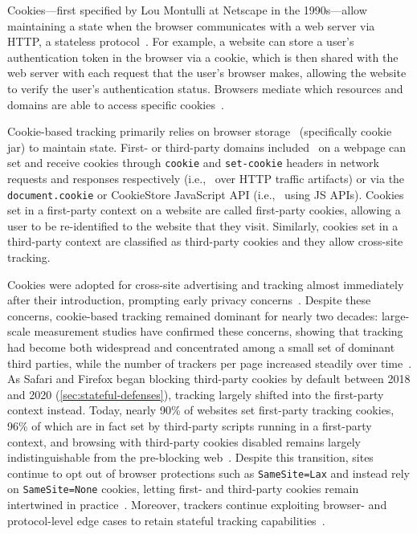 Cookies---first specified by Lou Montulli at Netscape in the 1990s---allow maintaining a state when the browser communicates with a web server via HTTP, a stateless protocol~\cite{kristolHTTPCookiesStandards2001}.
%
For example, a website can store a user's authentication token in the browser via a cookie, which is then shared with the web server with each request that the user's browser makes, allowing the website to verify the user's authentication status.
%
Browsers mediate which resources and domains are able to access specific cookies~\cite{beugin2024WebAlmanac2024,singhIncoherenciesWebBrowser2010,mdnSameoriginPolicySecurity2024}.


Cookie-based tracking primarily relies on browser storage \symStorage\ (specifically cookie jar) to maintain state. 
%
First- or third-party domains included \symInclusion\ on a webpage can set and receive cookies through \texttt{cookie} and \texttt{set-cookie} headers in network requests and responses respectively (i.e., \symSharing\ over HTTP traffic artifacts) or via the \texttt{document.cookie} or CookieStore JavaScript API (i.e., \symExecution\ using JS APIs).
%
Cookies set in a first-party context on a website are called first-party cookies, allowing a user to be re-identified to the website that they visit.
%
Similarly, cookies set in a third-party context are classified as third-party cookies and they allow cross-site tracking.


Cookies were adopted for cross-site advertising and tracking almost immediately after their introduction, prompting early privacy concerns~\cite{montulliHTTPStateManagement1997,kristolHTTPCookiesStandards2001,SenatorRaisesPrivacy2001}.
%
Despite these concerns, cookie-based tracking remained dominant for nearly two decades: large-scale measurement studies have confirmed these concerns, showing that tracking had become both widespread and concentrated among a small set of dominant third parties, while the number of trackers per page increased steadily over time~\cite{krishnamurthyPrivacyDiffusionWeb2009,lernerInternetJonesRaiders2016,englehardtOnlineTracking1millionsite2016,karajWhoTracksMeShedding2019,yuTrackingTrackers2016}.
%
As Safari and Firefox began blocking third-party cookies by default between 2018 and 2020 (\autoref{sec:stateful-defenses}), tracking largely shifted into the first-party context instead. 
%
Today, nearly 90\% of websites set first-party tracking cookies, 96\% of which are in fact set by third-party scripts running in a first-party context, and browsing with third-party cookies disabled remains largely indistinguishable from the pre-blocking web~\cite{munirCookieGraphUnderstandingDetecting2023,vekaria2024WebAlmanac2024,linBrowsingThirdPartyCookies2024}.
%
Despite this transition, sites continue to opt out of browser protections such as \texttt{SameSite=Lax} and instead rely on \texttt{SameSite=None} cookies, letting first- and third-party cookies remain intertwined in practice~\cite{khodayariStateSameSiteStudying2022}.
%
Moreover, trackers continue exploiting browser- and protocol-level edge cases to retain stateful tracking capabilities~\cite{khodayariStateSameSiteStudying2022,bashirHowTrackingCompanies2018}.


